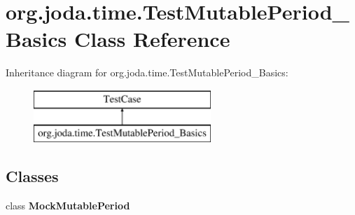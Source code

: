 \hypertarget{classorg_1_1joda_1_1time_1_1_test_mutable_period___basics}{\section{org.\-joda.\-time.\-Test\-Mutable\-Period\-\_\-\-Basics Class Reference}
\label{classorg_1_1joda_1_1time_1_1_test_mutable_period___basics}
}
Inheritance diagram for org.\-joda.\-time.\-Test\-Mutable\-Period\-\_\-\-Basics\-:\begin{figure}[H]
\begin{center}
\leavevmode
\includegraphics[height=2.000000cm]{classorg_1_1joda_1_1time_1_1_test_mutable_period___basics}
\end{center}
\end{figure}
\subsection*{Classes}
\begin{DoxyCompactItemize}
\item 
class {\bfseries Mock\-Mutable\-Period}
\end{DoxyCompactItemize}
